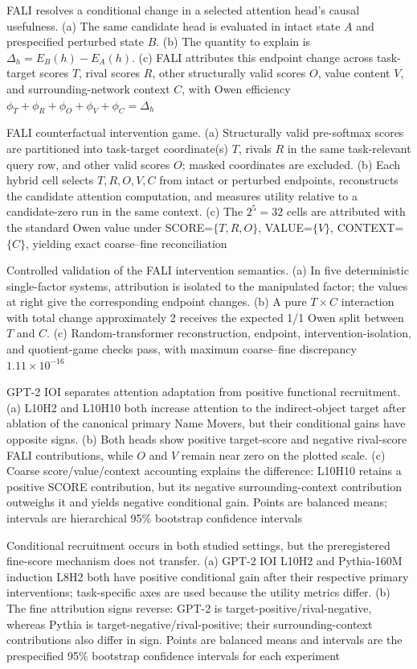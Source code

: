 
\caption{FALI resolves a conditional change in a selected attention head's causal usefulness. (a) The same candidate head is evaluated in intact state $A$ and prespecified perturbed state $B$. (b) The quantity to explain is $\Delta_h=E_B(h)-E_A(h)$. (c) FALI attributes this endpoint change across task-target scores $T$, rival scores $R$, other structurally valid scores $O$, value content $V$, and surrounding-network context $C$, with Owen efficiency $\phi_T+\phi_R+\phi_O+\phi_V+\phi_C=\Delta_h$}

\caption{FALI counterfactual intervention game. (a) Structurally valid pre-softmax scores are partitioned into task-target coordinate(s) $T$, rivals $R$ in the same task-relevant query row, and other valid scores $O$; masked coordinates are excluded. (b) Each hybrid cell selects $T,R,O,V,C$ from intact or perturbed endpoints, reconstructs the candidate attention computation, and measures utility relative to a candidate-zero run in the same context. (c) The $2^5=32$ cells are attributed with the standard Owen value under SCORE=$\{T,R,O\}$, VALUE=$\{V\}$, CONTEXT=$\{C\}$, yielding exact coarse--fine reconciliation}

\caption{Controlled validation of the FALI intervention semantics. (a) In five deterministic single-factor systems, attribution is isolated to the manipulated factor; the values at right give the corresponding endpoint changes. (b) A pure $T\times C$ interaction with total change approximately 2 receives the expected 1/1 Owen split between $T$ and $C$. (c) Random-transformer reconstruction, endpoint, intervention-isolation, and quotient-game checks pass, with maximum coarse--fine discrepancy $1.11\times10^{-16}$}

\caption{GPT-2 IOI separates attention adaptation from positive functional recruitment. (a) L10H2 and L10H10 both increase attention to the indirect-object target after ablation of the canonical primary Name Movers, but their conditional gains have opposite signs. (b) Both heads show positive target-score and negative rival-score FALI contributions, while $O$ and $V$ remain near zero on the plotted scale. (c) Coarse score/value/context accounting explains the difference: L10H10 retains a positive SCORE contribution, but its negative surrounding-context contribution outweighs it and yields negative conditional gain. Points are balanced means; intervals are hierarchical 95\% bootstrap confidence intervals}

\caption{Conditional recruitment occurs in both studied settings, but the preregistered fine-score mechanism does not transfer. (a) GPT-2 IOI L10H2 and Pythia-160M induction L8H2 both have positive conditional gain after their respective primary interventions; task-specific axes are used because the utility metrics differ. (b) The fine attribution signs reverse: GPT-2 is target-positive/rival-negative, whereas Pythia is target-negative/rival-positive; their surrounding-context contributions also differ in sign. Points are balanced means and intervals are the prespecified 95\% bootstrap confidence intervals for each experiment}
